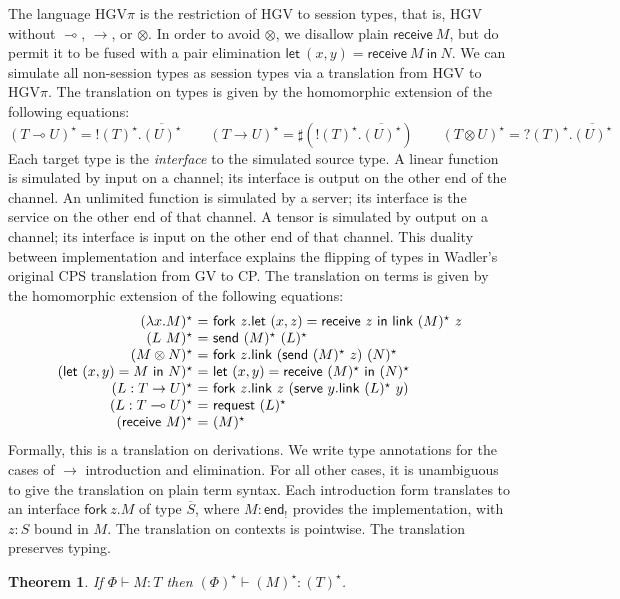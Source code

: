 \documentclass{easychair}
\makeatletter
\newtheorem{theorem}{Theorem}
\newcommand{\ba}{\begin{array}}
\newcommand{\ea}{\end{array}}
\newenvironment{equations}{\[\ba{@{}r@{~}c@{~}l@{}}}{\ea\]}
\newcommand{\key}{\mathsf}
\newcommand{\gvOutput}[2]{\mathord{!}{#1}.{#2}}
\newcommand{\gvInput}[2]{\mathord{?}{#1}.{#2}}
\newcommand{\gvEndOutput}{\key{end}_!}
\newcommand{\gvService}[1]{\sharp {#1}}
\newcommand{\gvDual}[1]{\overline{#1}}
\newcommand{\gvj}[3]{{#1} \vdash {#2} : {#3}}
\newcommand{\lolli}{\multimap}
\newcommand{\gvLinFun}[2]{{#1} \lolli {#2}}
\newcommand{\gvUnFun}[2]{{#1} \to {#2}}
\newcommand{\gvTimes}[2]{{#1} \otimes {#2}}
\newcommand{\gvLink}[2]{\key{link}~{#1}~{#2}}
\newcommand{\gvLam}[2]{\lambda {#1}.{#2}}
\newcommand{\gvApp}[2]{{#1}~{#2}}
\newcommand{\gvPair}[2]{({#1},{#2})}
\newcommand{\gvLet}[3]{\key{let}~{#1}={#2}~\key{in}~{#3}}
\newcommand{\gvSend}[2]{\key{send}~{#1}~{#2}}
\newcommand{\gvReceive}[1]{\key{receive}~{#1}}
\newcommand{\gvFork}[2]{\key{fork}~{#1}.{#2}}
\newcommand{\gvReceiveK}[4]{\gvLet{\gvPair{#1}{#2}}{\gvReceive{#3}}{#4}}
\newcommand{\gvServe}[2]{\key{serve}~{#1}.{#2}}
\newcommand{\gvRequest}[1]{\key{request}~{#1}}
\newcommand{\hgv}{HGV\xspace}
\newcommand{\hgvpi}{HGV$\pi$\xspace}
\newcommand{\lampi}[1]{({#1})^\star}
\makeatother
\begin{document}
The language \hgvpi is the restriction of \hgv to session types, that is, \hgv without $\lolli$,
$\to$, or $\otimes$. In order to avoid $\otimes$, we disallow plain $\gvReceive{M}$, but do permit
it to be fused with a pair elimination $\gvReceiveK{x}{y}{M}{N}$. We can simulate all non-session
types as session types via a translation from \hgv to \hgvpi. The translation on types is given by
the homomorphic extension of the following equations:
\[
\lampi{\gvLinFun{T}{U}} = \gvOutput{\lampi{T}}{\gvDual{\lampi{U}}} \qquad
\lampi{\gvUnFun{T}{U}} = \gvService{(\gvOutput{\lampi{T}}{\gvDual{\lampi{U}}})} \qquad
\lampi{\gvTimes{T}{U}} = \gvInput{\lampi{T}}{\gvDual{\lampi{U}}}
\]%
Each target type is the \emph{interface} to the simulated source type. A linear function is
simulated by input on a channel; its interface is output on the other end of the channel. An
unlimited function is simulated by a server; its interface is the service on the other end of that
channel. A tensor is simulated by output on a channel; its interface is input on the other end of
that channel.
%
This duality between implementation and interface explains the flipping of types in Wadler's
original CPS translation from GV to CP.
%
The translation on terms is given by the homomorphic extension of the following equations:
\begin{equations}
\lampi{\gvLam{x}{M}} &=& \gvFork{z}{\gvLet{\gvPair{x}{z}}{\gvReceive{z}}{\gvLink{\lampi{M}}{z}}} \\
\lampi{\gvApp{L}{M}} &=& \gvSend{\lampi{M}}{\lampi{L}} \\
\lampi{\gvTimes{M}{N}} &=&
  \gvFork{z}
    {\gvLink{(\gvSend{\lampi{M}}{z})}{\lampi{N}}} \\
\lampi{\gvLet{\gvPair{x}{y}}{M}{N}} &=&
    \gvLet{\gvPair{x}{y}}{\gvReceive{\lampi{M}}}{\lampi{N}} \\
\lampi{L : \gvUnFun{T}{U}} &=&
  \gvFork{z}{\gvLink{z}{(\gvServe{y}{\gvLink{\lampi{L}}{y}})}} \\
\lampi{L : \gvLinFun{T}{U}} &=& \gvRequest{\lampi{L}} \\
\lampi{\gvReceive{M}} &=& \lampi{M} \\
\end{equations}%
Formally, this is a translation on derivations. We write type annotations for the cases of $\to$
introduction and elimination. For all other cases, it is unambiguous to give the translation on
plain term syntax. Each introduction form translates to an interface $\gvFork{z}{M}$ of type
$\gvDual{S}$, where $M : \gvEndOutput$ provides the implementation, with $z : S$ bound in $M$.
%
The translation on contexts is pointwise.
The translation preserves typing.
\begin{theorem}
If $\gvj{\Phi}{M}{T}$ then $\gvj{\lampi{\Phi}}{\lampi{M}}{\lampi{T}}$.
\end{theorem}
\end{document}

